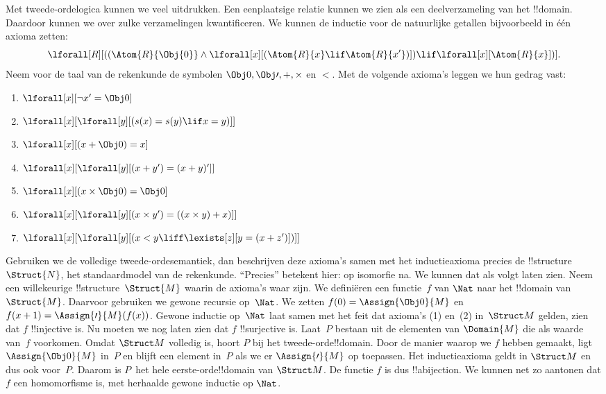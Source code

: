 \documentclass[openany]{memoir}
\begin{document}
Met tweede-ordelogica kunnen we veel uitdrukken. Een eenplaatsige relatie
kunnen we zien als een deelverzameling van het !!{domain}. Daardoor kunnen we
over zulke verzamelingen kwantificeren. We kunnen de inductie voor de
natuurlijke getallen bijvoorbeeld in één axioma zetten:
\[
\lforall[R][((\Atom{R}{\Obj{0}} \land \lforall[x][(\Atom{R}{x} \lif
    \Atom{R}{x'})]) \lif \lforall[x][\Atom{R}{x}])].
\]
Neem voor de taal van de rekenkunde de symbolen $\Obj 0, \Obj \prime, +,
\times$ en $<$. Met de volgende axioma's leggen we hun gedrag vast:
\begin{enumerate}
\item $\lforall[x][\lnot x' = \Obj 0]$
\item $\lforall[x][\lforall[y][(s(x) = s(y) \lif x = y)]]$
\item $\lforall[x][(x + \Obj 0) = x]$
\item $\lforall[x][\lforall[y][(x + y') = (x + y)']]$
\item $\lforall[x][(x \times \Obj 0) = \Obj 0]$
\item $\lforall[x][\lforall[y][(x \times y') = ((x \times y) + x)]]$
\item $\lforall[x][\lforall[y][(x < y \liff \lexists[z][y = (x + z')])]]$
\end{enumerate}
Gebruiken we de volledige tweede-ordesemantiek, dan beschrijven deze axioma's
samen met het inductieaxioma precies de !!{structure}~$\Struct{N}$, het
standaardmodel van de rekenkunde. ``Precies'' betekent hier: op isomorfie na.
We kunnen dat als volgt laten zien. Neem een willekeurige
!!{structure}~$\Struct{M}$ waarin de axioma's waar zijn. We definiëren een
functie~$f$ van $\Nat$ naar het !!{domain} van $\Struct{M}$. Daarvoor
gebruiken we gewone recursie op~$\Nat$. We zetten
$f(0) = \Assign{\Obj 0}{M}$ en
$f(x+1) = \Assign{\prime}{M}(f(x))$. Gewone inductie op~$\Nat$ laat samen
met het feit dat axioma's (1) en~(2) in~$\Struct M$ gelden, zien dat $f$
!!{injective} is. Nu moeten we nog laten
zien dat $f$ !!{surjective} is. Laat~$P$ bestaan uit de elementen van
$\Domain{M}$ die als waarde van~$f$ voorkomen. Omdat $\Struct M$ volledig is,
hoort $P$ bij het tweede-orde!!{domain}. Door de manier waarop we $f$ hebben
gemaakt, ligt $\Assign{\Obj 0}{M}$ in~$P$ en blijft een element in~$P$ als we
er $\Assign{\prime}{M}$ op toepassen. Het inductieaxioma geldt in $\Struct M$
en dus ook voor~$P$. Daarom is $P$~het hele eerste-orde!!{domain} van
$\Struct M$. De functie $f$ is dus !!a{bijection}. We kunnen net zo aantonen
dat $f$ een homomorfisme is, met herhaalde gewone inductie op $\Nat$.
\end{document}
